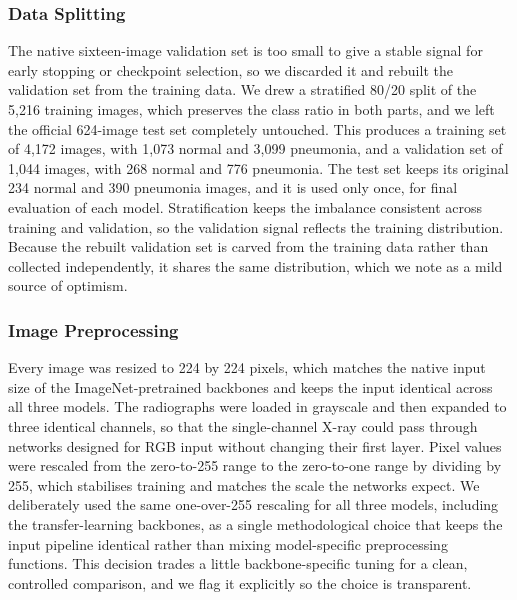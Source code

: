 \documentclass[preprint,12pt]{elsarticle}
\begin{document}
\subsubsection{Data Splitting}
The native sixteen-image validation set is too small to give a stable signal for early stopping or checkpoint selection, so we discarded it and rebuilt the validation set from the training data.
We drew a stratified 80/20 split of the 5{,}216 training images, which preserves the class ratio in both parts, and we left the official 624-image test set completely untouched.
This produces a training set of 4{,}172 images, with 1{,}073 normal and 3{,}099 pneumonia, and a validation set of 1{,}044 images, with 268 normal and 776 pneumonia.
The test set keeps its original 234 normal and 390 pneumonia images, and it is used only once, for final evaluation of each model.
Stratification keeps the imbalance consistent across training and validation, so the validation signal reflects the training distribution.
Because the rebuilt validation set is carved from the training data rather than collected independently, it shares the same distribution, which we note as a mild source of optimism.

\subsubsection{Image Preprocessing}
Every image was resized to 224 by 224 pixels, which matches the native input size of the ImageNet-pretrained backbones and keeps the input identical across all three models.
The radiographs were loaded in grayscale and then expanded to three identical channels, so that the single-channel X-ray could pass through networks designed for RGB input without changing their first layer.
Pixel values were rescaled from the zero-to-255 range to the zero-to-one range by dividing by 255, which stabilises training and matches the scale the networks expect.
We deliberately used the same one-over-255 rescaling for all three models, including the transfer-learning backbones, as a single methodological choice that keeps the input pipeline identical rather than mixing model-specific preprocessing functions.
This decision trades a little backbone-specific tuning for a clean, controlled comparison, and we flag it explicitly so the choice is transparent.
\end{document}
